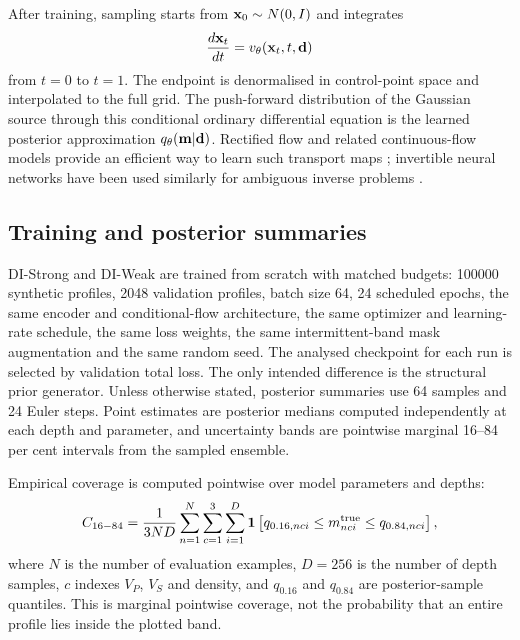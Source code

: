 \documentclass[referee]{gji}
\begin{document}
After training, sampling starts from ${\bf x}_0\sim N(0,I)$ and integrates
\begin{equation}
\frac{d{\bf x}_t}{dt}=v_\theta({\bf x}_t,t,{\bf d})
\label{eq:ode}
\end{equation}
from $t=0$ to $t=1$. The endpoint is denormalised in control-point space and interpolated to the full grid. The push-forward distribution of the Gaussian source through this conditional ordinary differential equation is the learned posterior approximation $q_\theta({\bf m}|{\bf d})$. Rectified flow and related continuous-flow models provide an efficient way to learn such transport maps \citep{LiuGongLiu2022,LipmanEtAl2023}; invertible neural networks have been used similarly for ambiguous inverse problems \citep{ArdizzoneEtAl2019}.

\subsection{Training and posterior summaries}

DI-Strong and DI-Weak are trained from scratch with matched budgets: 100000 synthetic profiles, 2048 validation profiles, batch size 64, 24 scheduled epochs, the same encoder and conditional-flow architecture, the same optimizer and learning-rate schedule, the same loss weights, the same intermittent-band mask augmentation and the same random seed. The analysed checkpoint for each run is selected by validation total loss. The only intended difference is the structural prior generator. Unless otherwise stated, posterior summaries use 64 samples and 24 Euler steps. Point estimates are posterior medians computed independently at each depth and parameter, and uncertainty bands are pointwise marginal 16--84 per cent intervals from the sampled ensemble.

Empirical coverage is computed pointwise over model parameters and depths:
\begin{equation}
C_{16-84}=
\frac{1}{3ND}
\sum_{n=1}^{N}
\sum_{c=1}^{3}
\sum_{i=1}^{D}
{\bf 1}\left[
q_{0.16,nci}\le m^{\rm true}_{nci}\le q_{0.84,nci}
\right],
\label{eq:coverage}
\end{equation}
where $N$ is the number of evaluation examples, $D=256$ is the number of depth samples, $c$ indexes $V_P$, $V_S$ and density, and $q_{0.16}$ and $q_{0.84}$ are posterior-sample quantiles. This is marginal pointwise coverage, not the probability that an entire profile lies inside the plotted band.
\end{document}
